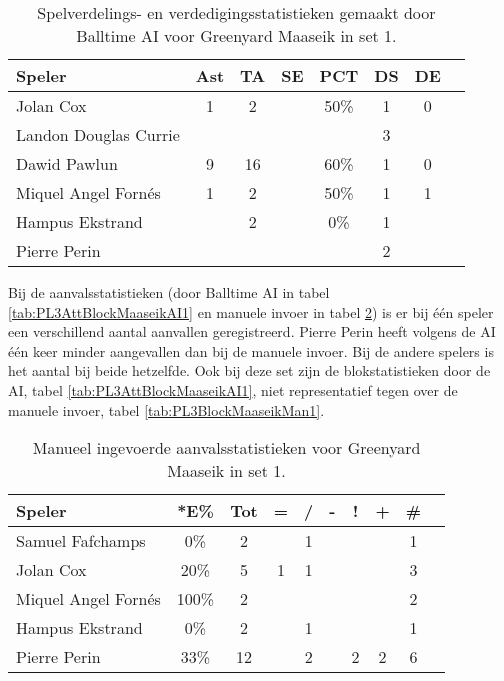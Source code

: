 \begin{table}[ht!]
  \centering
  \scriptsize
  \begin{tabular}{|l|c|c|c|c|c|c|c|} \hline
    \textbf{Speler} & Ast & TA & SE & PCT & DS & DE \\ \hline
    Jolan Cox & 1 & 2 &  & 50\% & 1 & 0 \\
    Landon Douglas Currie &  &  &   &   & 3 &   \\
    Dawid Pawlun & 9 & 16 &  & 60\% & 1 & 0 \\
    Miquel Angel Fornés & 1 & 2 & & 50\% & 1 & 1 \\
    Hampus Ekstrand &  & 2 &  & 0\% & 1 & \\
    Pierre Perin &   &   &   &   & 2 &   \\ \hline
  \end{tabular}
  \caption[Spelverdelings- en verdedigingsstatistieken gemaakt door Balltime AI voor Greenyard Maaseik in set 1]{\label{tab:PL3SetDigMaaseikAI1}Spelverdelings- en verdedigingsstatistieken gemaakt door Balltime AI voor Greenyard Maaseik in set 1.}
\end{table}

Bij de aanvalsstatistieken (door Balltime AI in tabel \ref{tab:PL3AttBlockMaaseikAI1} en manuele invoer in tabel \ref{tab:PL3AttMaaseikMan1}) is er bij één speler een verschillend aantal aanvallen geregistreerd. Pierre Perin heeft volgens de AI één keer minder aangevallen dan bij de manuele invoer. Bij de andere spelers is het aantal bij beide hetzelfde. Ook bij deze set zijn de blokstatistieken door de AI, tabel \ref{tab:PL3AttBlockMaaseikAI1}, niet representatief tegen over de manuele invoer, tabel \ref{tab:PL3BlockMaaseikMan1}.

\begin{table}[ht!]
    \centering
    \scriptsize
    \begin{tabular}{|l|c|c|c|c|c|c|c|c|c|} \hline
        \textbf{Speler} & *E\% & Tot & = & / & - & ! & + & \# \\ \hline
        Samuel Fafchamps & 0\% & 2 &  & 1 &  &  &  & 1 \\ 
        Jolan Cox & 20\% & 5 & 1 & 1 &  &  &  & 3 \\ 
        Miquel Angel Fornés & 100\% & 2 &  &  &  &  &  & 2 \\ 
        Hampus Ekstrand & 0\% & 2 &  & 1 &  &  &  & 1 \\ 
        Pierre Perin & 33\% & 12 &  & 2 &  & 2 & 2 & 6 \\ \hline
    \end{tabular}
    \caption[Manueel ingevoerde aanvalsstatistieken voor Greenyard Maaseik in set 1]{\label{tab:PL3AttMaaseikMan1}Manueel ingevoerde aanvalsstatistieken voor Greenyard Maaseik in set 1.}
\end{table}

